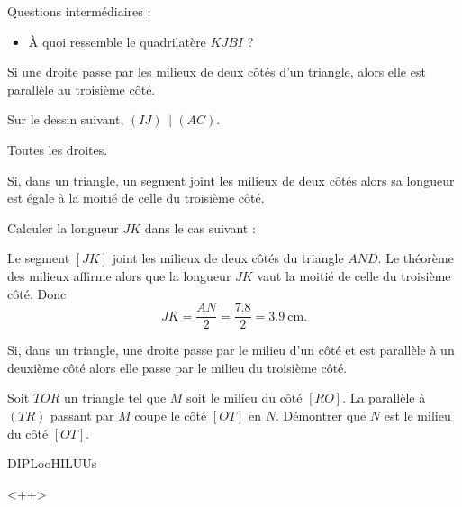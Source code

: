 



\vspace{2cm}

Questions intermédiaires : 
\begin{itemize}
    \item  À quoi ressemble le quadrilatère \( KJBI\) ?
\end{itemize}

\begin{theorem}
    Si une droite passe par les milieux de deux côtés d'un triangle, alors elle est parallèle au troisième côté.
\end{theorem}

Sur le dessin suivant, \( (IJ)\parallel (AC)\).
\begin{center}
   
\end{center}

Toutes les droites.
\begin{center}
   
\end{center}

\begin{theorem}
Si, dans un triangle, un segment joint les milieux de deux côtés alors sa longueur est égale à la moitié de celle du troisième côté.
\end{theorem}

\begin{example}
    Calculer la longueur \( JK\) dans le cas suivant :
\begin{center}
   
\end{center}
\end{example}

Le segment \( [JK]\) joint les milieux de deux côtés du triangle \( AND\). Le théorème des milieux affirme alors que la longueur \( JK\) vaut la moitié de celle du troisième côté. Donc
\begin{equation}
    JK=\frac{ AN }{2}=\frac{ 7.8 }{ 2 }=\SI{3.9}{\centi\meter}.
\end{equation}



\begin{theorem}
    Si, dans un triangle, une droite passe par le milieu d'un côté et est parallèle à un deuxième côté alors elle passe par le milieu du troisième côté.
\end{theorem}

\begin{example}
Soit $TOR$ un triangle tel que $M$ soit le milieu du côté $[RO]$. La parallèle à $(TR)$ passant par $M$ coupe le côté $[OT]$ en $N$. Démontrer que $N$ est le milieu du côté $[OT]$.    

DIPLooHILUUs

\end{example}
<++>

